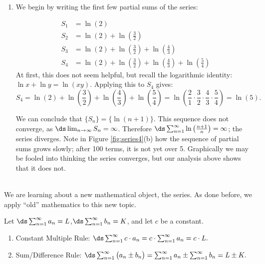 {\begin{enumerate}
\item		We begin by writing the first few partial sums of the series:

\begin{align*}
S_1 &= \ln\left(2\right) \\
S_2 &= \ln\left(2\right)+\ln\left(\frac32\right) \\
S_3 &= \ln\left(2\right)+\ln\left(\frac32\right)+\ln\left(\frac43\right) \\
S_4 &= \ln\left(2\right)+\ln\left(\frac32\right)+\ln\left(\frac43\right)+\ln\left(\frac54\right) 
\end{align*}
At first, this does not seem helpful, but recall the logarithmic identity: $\ln x+\ln y = \ln (xy).$ Applying this to $S_4$ gives:
$$S_4 = \ln\left(2\right)+\ln\left(\frac32\right)+\ln\left(\frac43\right)+\ln\left(\frac54\right) = \ln\left(\frac21\cdot\frac32\cdot\frac43\cdot\frac54\right) = \ln\left(5\right).$$

We can conclude that $\{S_n\} = \big\{\ln (n+1)\big\}$. This sequence  does not converge, as $\ds \lim_{n\to\infty}S_n=\infty$. Therefore  $\ds\sum_{n=1}^\infty  \ln\left(\frac{n+1}{n}\right)=\infty$; the series diverges. Note in Figure \ref{fig:series4}(b) how the sequence of partial sums grows slowly; after 100 terms, it is not yet over 5. Graphically we may be fooled into thinking the series converges, but our analysis above shows that it does not.
\end{enumerate}
\baselineskip
}\\

We are learning about a new mathematical object, the series. As done before, we apply ``old'' mathematics to this new topic.

{Let \quad$\ds \sum_{n=1}^\infty a_n = L$,\quad  $\ds\sum_{n=1}^\infty b_n = K$, and let $c$ be a constant.
\begin{enumerate}
\item  Constant Multiple Rule: $\ds\sum_{n=1}^\infty c\cdot a_n = c\cdot\sum_{n=1}^\infty a_n = c\cdot L.$
\item		Sum/Difference Rule: $\ds\sum_{n=1}^\infty \big(a_n\pm b_n\big) = \sum_{n=1}^\infty a_n \pm \sum_{n=1}^\infty b_n = L \pm K.$
\end{enumerate} 
}

